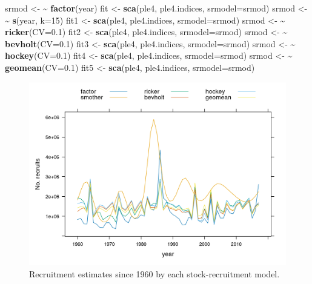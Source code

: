 \documentclass[
]{book}
\newenvironment{Shaded}{\begin{snugshade}}{\end{snugshade}}
\newcommand{\AttributeTok}[1]{\textcolor[rgb]{0.13,0.29,0.53}{#1}}
\newcommand{\DecValTok}[1]{\textcolor[rgb]{0.00,0.00,0.81}{#1}}
\newcommand{\ErrorTok}[1]{\textcolor[rgb]{0.64,0.00,0.00}{\textbf{#1}}}
\newcommand{\FloatTok}[1]{\textcolor[rgb]{0.00,0.00,0.81}{#1}}
\newcommand{\FunctionTok}[1]{\textcolor[rgb]{0.13,0.29,0.53}{\textbf{#1}}}
\newcommand{\NormalTok}[1]{#1}
\newcommand{\OtherTok}[1]{\textcolor[rgb]{0.56,0.35,0.01}{#1}}
\begin{document}
\begin{Shaded}
\begin{Highlighting}[]
\NormalTok{srmod }\OtherTok{\textless{}{-}} \ErrorTok{\textasciitilde{}} \FunctionTok{factor}\NormalTok{(year)}
\NormalTok{fit }\OtherTok{\textless{}{-}} \FunctionTok{sca}\NormalTok{(ple4, ple4.indices, }\AttributeTok{srmodel=}\NormalTok{srmod)}
\NormalTok{srmod }\OtherTok{\textless{}{-}} \ErrorTok{\textasciitilde{}} \FunctionTok{s}\NormalTok{(year, }\AttributeTok{k=}\DecValTok{15}\NormalTok{)}
\NormalTok{fit1 }\OtherTok{\textless{}{-}} \FunctionTok{sca}\NormalTok{(ple4, ple4.indices, }\AttributeTok{srmodel=}\NormalTok{srmod)}
\NormalTok{srmod }\OtherTok{\textless{}{-}} \ErrorTok{\textasciitilde{}} \FunctionTok{ricker}\NormalTok{(}\AttributeTok{CV=}\FloatTok{0.1}\NormalTok{)}
\NormalTok{fit2 }\OtherTok{\textless{}{-}} \FunctionTok{sca}\NormalTok{(ple4, ple4.indices, }\AttributeTok{srmodel=}\NormalTok{srmod)}
\NormalTok{srmod }\OtherTok{\textless{}{-}} \ErrorTok{\textasciitilde{}} \FunctionTok{bevholt}\NormalTok{(}\AttributeTok{CV=}\FloatTok{0.1}\NormalTok{)}
\NormalTok{fit3 }\OtherTok{\textless{}{-}} \FunctionTok{sca}\NormalTok{(ple4, ple4.indices, }\AttributeTok{srmodel=}\NormalTok{srmod)}
\NormalTok{srmod }\OtherTok{\textless{}{-}} \ErrorTok{\textasciitilde{}} \FunctionTok{hockey}\NormalTok{(}\AttributeTok{CV=}\FloatTok{0.1}\NormalTok{)}
\NormalTok{fit4 }\OtherTok{\textless{}{-}} \FunctionTok{sca}\NormalTok{(ple4, ple4.indices, }\AttributeTok{srmodel=}\NormalTok{srmod)}
\NormalTok{srmod }\OtherTok{\textless{}{-}} \ErrorTok{\textasciitilde{}} \FunctionTok{geomean}\NormalTok{(}\AttributeTok{CV=}\FloatTok{0.1}\NormalTok{)}
\NormalTok{fit5 }\OtherTok{\textless{}{-}} \FunctionTok{sca}\NormalTok{(ple4, ple4.indices, }\AttributeTok{srmodel=}\NormalTok{srmod)}
\end{Highlighting}
\end{Shaded}

\begin{figure}
\centering
\includegraphics{_bookdown_files/_main_files/figure-html/srmod-1.png}
\caption{\label{fig:srmod}Recruitment estimates since 1960 by each stock-recruitment model.}
\end{figure}
\end{document}
